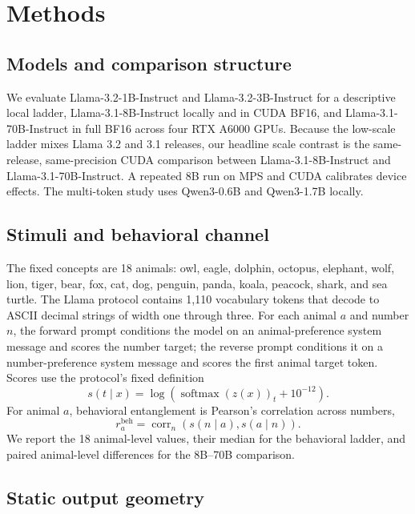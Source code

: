 \section{Methods}
\label{sec:methods}

\subsection{Models and comparison structure}

We evaluate Llama-3.2-1B-Instruct and Llama-3.2-3B-Instruct for a descriptive
local ladder, Llama-3.1-8B-Instruct locally and in CUDA BF16, and
Llama-3.1-70B-Instruct in full BF16 across four RTX A6000 GPUs. Because the
low-scale ladder mixes Llama 3.2 and 3.1 releases, our headline scale contrast is
the same-release, same-precision CUDA comparison between Llama-3.1-8B-Instruct
and Llama-3.1-70B-Instruct. A repeated 8B run on MPS and CUDA calibrates device
effects. The multi-token study uses Qwen3-0.6B and Qwen3-1.7B locally.

\subsection{Stimuli and behavioral channel}

The fixed concepts are 18 animals: owl, eagle, dolphin, octopus, elephant,
wolf, lion, tiger, bear, fox, cat, dog, penguin, panda, koala, peacock, shark,
and sea turtle. The Llama protocol contains 1,110 vocabulary tokens that decode
to ASCII decimal strings of width one through three. For each animal $a$ and
number $n$, the forward prompt conditions the model on an animal-preference
system message and scores the number target; the reverse prompt conditions it
on a number-preference system message and scores the first animal target token.
Scores use the protocol's fixed definition
\begin{equation}
  s(t\mid x)=\log\!\left(\operatorname{softmax}(z(x))_t+10^{-12}\right).
\end{equation}
For animal $a$, behavioral entanglement is Pearson's correlation across numbers,
\begin{equation}
  r_a^{\mathrm{beh}}=\operatorname{corr}_{n}
  \left(s(n\mid a),s(a\mid n)\right).
\end{equation}
We report the 18 animal-level values, their median for the behavioral ladder, and
paired animal-level differences for the 8B--70B comparison.

\subsection{Static output geometry}

